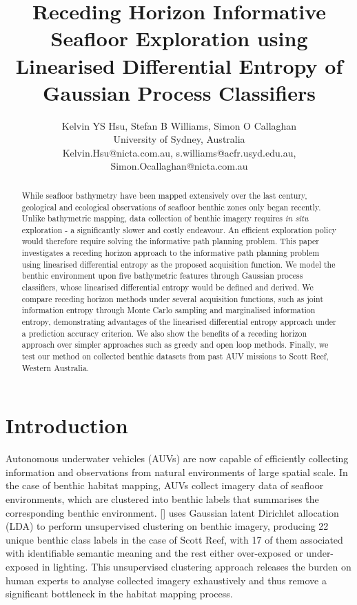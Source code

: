 \documentclass{article}
\title{Receding Horizon Informative Seafloor Exploration using Linearised Differential Entropy of Gaussian Process Classifiers}
\author{Kelvin YS Hsu, Stefan B Williams, Simon O Callaghan \\ University of Sydney, Australia \\ 
Kelvin.Hsu@nicta.com.au, s.williams@acfr.usyd.edu.au, Simon.Ocallaghan@nicta.com.au}
\newcommand{\incite}[1]{\citeauthor{#1} [\citeyear{#1}]}
\begin{document}
\maketitle

\begin{abstract}
	While seafloor bathymetry have been mapped extensively over the last century, geological and ecological observations of seafloor benthic zones only began recently. Unlike bathymetric mapping, data collection of benthic imagery requires \textit{in situ} exploration - a significantly slower and costly endeavour. An efficient exploration policy would therefore require solving the informative path planning problem. This paper investigates a receding horizon approach to the informative path planning problem using linearised differential entropy as the proposed acquisition function. We model the benthic environment upon five bathymetric features through Gaussian process classifiers, whose linearised differential entropy would be defined and derived. We compare receding horizon methods under several acquisition functions, such as joint information entropy through Monte Carlo sampling and marginalised information entropy, demonstrating advantages of the linearised differential entropy approach under a prediction accuracy criterion. We also show the benefits of a receding horizon approach over simpler approaches such as greedy and open loop methods. Finally, we test our method on collected benthic datasets from past AUV missions to Scott Reef, Western Australia.
\end{abstract}

\section{Introduction}
\label{Section:Introduction}

	Autonomous underwater vehicles (AUVs) are now capable of efficiently collecting information and observations from natural environments of large spatial scale. In the case of benthic habitat mapping, AUVs collect imagery data of seafloor environments, which are clustered into benthic labels that summarises the corresponding benthic environment. \incite{Steinberg2015128} uses Gaussian latent Dirichlet allocation (LDA) to perform unsupervised clustering on benthic imagery, producing 22 unique benthic class labels in the case of Scott Reef, with 17 of them associated with identifiable semantic meaning and the rest either over-exposed or under-exposed in lighting. This unsupervised clustering approach releases the burden on human experts to analyse collected imagery exhaustively and thus remove a significant bottleneck in the habitat mapping process.
	
\end{document}
